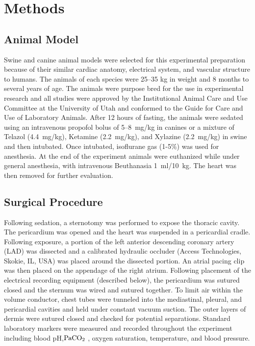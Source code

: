 \documentclass[twocolumn]{cinc}
\begin{document}

\section{Methods}

\subsection{Animal Model} 

Swine and canine animal models were selected for this experimental
preparation because of their similar cardiac
anatomy, electrical system, and vascular structure to humans. The animals
of each species were 25--35 kg in weight and 8 months to
several years of age. The animals were purpose bred for the use
in experimental research and all studies were approved by the
Institutional Animal Care and Use Committee at the University of Utah and
conformed to the Guide for Care and Use of Laboratory Animals. After 12
hours of fasting, the animals were sedated using an intravenous propofol
bolus of 5--8~mg/kg in canines or a mixture of Telazol
(4.4~mg/kg), Ketamine (2.2~mg/kg), and Xylazine (2.2~mg/kg) in swine and then intubated. Once intubated,
isoflurane gas (1-5\%) was used for anesthesia. At the end of the
experiment animals were euthanized while under general anesthesia, with
intravenous Beuthanasia 1~ml/10~kg. The heart was then removed for further
evaluation.

\subsection{Surgical Procedure}

Following sedation, a sternotomy was performed to expose the thoracic
cavity. The pericardium was opened and the heart was suspended in a
pericardial cradle. Following exposure, a portion of the left anterior
descending coronary artery (LAD) was dissected and a calibrated hydraulic
occluder (Access Technologies, Skokie, IL, USA) was placed around the
dissected portion. An atrial pacing clip was then
placed on the appendage of the right atrium. Following placement of
the electrical recording equipment (described below), the pericardium was
sutured closed and the sternum was wired and sutured together. To limit air
within the volume conductor, chest tubes were tunneled into the
mediastinal, pleural, and pericardial cavities and held under constant
vacuum suction. The outer layers of dermis were sutured closed and checked
for potential separations. Standard laboratory markers were measured and
recorded throughout the experiment including blood pH,${\rm PaCO_2}$ , oxygen saturation,
temperature, and blood pressure.
\end{document}
